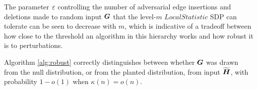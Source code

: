\begin{remark}
    The parameter $\varepsilon$ controlling the number of adversarial edge insertions and deletions made to random input $\boldsymbol{G}$ that the level-$m$ $LocalStatistic$ SDP can tolerate can be seen to decrease with $m$, which is indicative of a tradeoff between how close to the threshold an algorithm in this hierarchy works and how robust it is to perturbations.
\end{remark}

\begin{corollary}
	Algorithm \ref{alg:robust} correctly distinguishes between whether $\boldsymbol{G}$ was drawn from the null distribution, or from the planted distribution, from input $\widetilde{\boldsymbol{H}}$, with probability $1-o(1)$ when $\kappa(n) = o(n)$.
\end{corollary}



